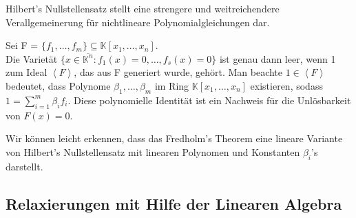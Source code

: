 \noindent Hilbert's Nullstellensatz stellt eine strengere und weitreichendere Verallgemeinerung für nichtlineare Polynomialgleichungen dar.

\begin{theorem}
Sei F = $\{f_1,\ldots,f_m\} \subseteq \mathbb{K}[x_1,\ldots,x_n]$.\\
Die Varietät $\{x \in \overline{\mathbb{K}^n} : f_1(x)=0,\ldots,f_s(x)=0\}$ ist genau dann leer, wenn 1 zum Ideal $\left\langle F \right\rangle$, das aus F generiert wurde, gehört. Man beachte $1 \in \left\langle F \right\rangle$ bedeutet, dass Polynome $\beta_1,\ldots,\beta_m$ im Ring $\mathbb{K}[x_1,\ldots,x_n]$ existieren, sodass $1 = \sum_{i=1}^m \beta_i f_i$. Diese polynomielle Identität ist ein Nachweis für die Unlösbarkeit von $F(x) = 0$. 
\end{theorem}

\noindent Wir können leicht erkennen, dass das Fredholm's Theorem eine lineare Variante von Hilbert's Nullstellensatz mit linearen Polynomen und Konstanten $\beta_i$'s darstellt. \cite{Ausgangsartikel}

\subsection{Relaxierungen mit Hilfe der Linearen Algebra}

